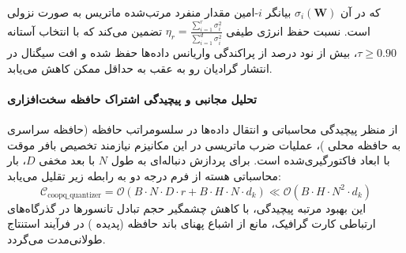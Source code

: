 که در آن $\sigma_i(\mathbf{W})$ بیانگر $i$-امین مقدار منفرد مرتب‌شده ماتریس به صورت نزولی است. نسبت حفظ انرژی طیفی $\eta_r = \frac{\sum_{i=1}^r \sigma_i^2}{\sum_{i=1}^{d} \sigma_i^2}$ تضمین می‌کند که با انتخاب آستانه $\tau \ge 0.90$، بیش از نود درصد از پراکندگی واریانس داده‌ها حفظ شده و افت سیگنال در انتشار گرادیان رو به عقب به حداقل ممکن کاهش می‌یابد.

\paragraph{تحلیل مجانبی و پیچیدگی اشتراک حافظه سخت‌افزاری}
از منظر پیچیدگی محاسباتی و انتقال داده‌ها در سلسومراتب حافظه (حافظه سراسری  به حافظه محلی )، عملیات ضرب ماتریسی در این مکانیزم نیازمند تخصیص بافر موقت با ابعاد فاکتورگیری‌شده است. برای پردازش دنباله‌ای به طول $N$ با بعد مخفی $D$، بار محاسباتی هسته از فرم درجه دو به رابطه زیر تقلیل می‌یابد:
\begin{equation}
\label{eq:complexity_coopq_quantizer}
\mathcal{C}_{\text{coopq\_quantizer}} = \mathcal{O}\left( B \cdot N \cdot D \cdot r + B \cdot H \cdot N \cdot d_k \right) \ll \mathcal{O}\left( B \cdot H \cdot N^2 \cdot d_k \right)
\end{equation}
این بهبود مرتبه پیچیدگی، با کاهش چشمگیر حجم تبادل تانسورها در گذرگاه‌های ارتباطی کارت گرافیک، مانع از اشباع پهنای باند حافظه (پدیده ) در فرآیند استنتاج طولانی‌مدت می‌گردد.
